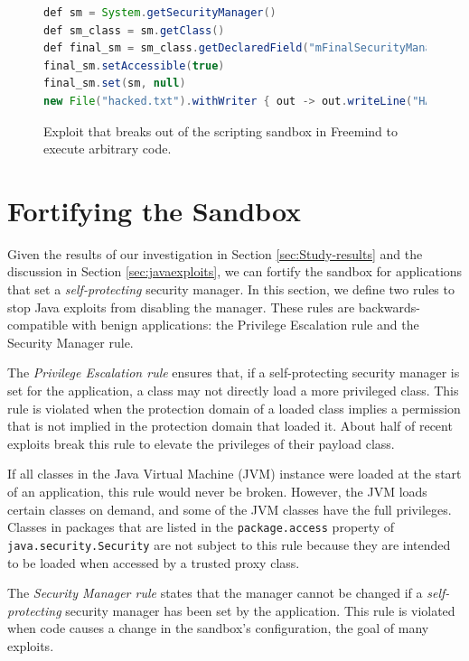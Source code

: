\documentclass{sig-alternate}
\begin{document}
\begin{figure}
\begin{lstlisting}[language=Java,basicstyle={\scriptsize},breaklines=true]
def sm = System.getSecurityManager() 
def sm_class = sm.getClass() 
def final_sm = sm_class.getDeclaredField("mFinalSecurityManager")
final_sm.setAccessible(true) 
final_sm.set(sm, null)
new File("hacked.txt").withWriter { out -> out.writeLine("HACKED!") }
\end{lstlisting}


\caption{Exploit that breaks out of the scripting sandbox in Freemind\label{fig:Example-Exploit-for-Freemind}
to execute arbitrary code.}
\end{figure}

\section{Fortifying the Sandbox}\label{sec:Rules-for-Fortifying}

Given the results of our investigation in Section \ref{sec:Study-results}
and the discussion in Section \ref{sec:javaexploits}, we can fortify
the sandbox for applications that set a \emph{self-protecting} security
manager. In this section, we define two rules to stop Java exploits
from disabling the manager. These rules are backwards-compatible with
benign applications: the Privilege Escalation rule and the Security
Manager rule. 

The \textit{Privilege Escalation rule} ensures that, if a self-protecting
security manager is set for the application, a class may not directly
load a more privileged class. This rule is violated when the protection
domain of a loaded class implies a permission that is not implied
in the protection domain that loaded it. About half of recent exploits
break this rule to elevate the privileges of their payload class.

If all classes in the Java Virtual Machine (JVM) instance were loaded
at the start of an application, this rule would never be broken. However,
the JVM loads certain classes on demand, and some of the JVM classes
have the full privileges. Classes in
packages that are listed in the \texttt{package.access} property of
\texttt{java.security.Security} are not subject to this rule because they are intended to be
loaded when accessed by a trusted proxy class. 

The \textit{Security Manager rule} states that the manager cannot
be changed if a \emph{self-protecting} security manager has been set
by the application. This rule is violated when code causes a change
in the sandbox's configuration, the goal of many exploits.
\end{document}
